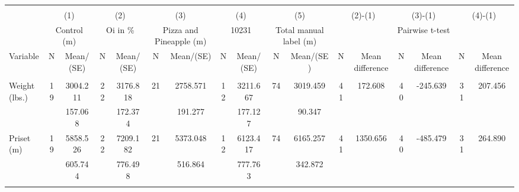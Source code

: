 
\begin{tabular}{@{\extracolsep{5pt}}lcccccccccccccccc}
\\[-1.8ex]\hline \hline \\[-1.8ex]
 & \multicolumn{2}{c}{(1)}  & \multicolumn{2}{c}{(2)}  & \multicolumn{2}{c}{(3)}  & \multicolumn{2}{c}{(4)}  & \multicolumn{2}{c}{(5)}  & \multicolumn{2}{c}{(2)-(1)} & \multicolumn{2}{c}{(3)-(1)} & \multicolumn{2}{c}{(4)-(1)} \\
 & \multicolumn{2}{c}{Control (m)}  & \multicolumn{2}{c}{Oi in \%}  & \multicolumn{2}{c}{Pizza and Pineapple (m)}  & \multicolumn{2}{c}{10231}  & \multicolumn{2}{c}{Total manual label (m)}  & \multicolumn{6}{c}{Pairwise t-test}  \\
Variable & N & Mean/(SE) & N & Mean/(SE) & N & Mean/(SE) & N & Mean/(SE) & N & Mean/(SE) & N & Mean difference & N & Mean difference & N & Mean difference \\ \hline \\[-1.8ex] 
Weight (lbs.)   & 19    &  3004.211    & 22    &  3176.818    & 21    &  2758.571    & 12    &  3211.667    & 74    &  3019.459    & 41    &   172.608    & 40    &  -245.639    & 31    &   207.456   \\
 &   &   157.068  &   &   172.374  &   &   191.277  &   &   177.127  &   &    90.347  &   &  &   &  &   &   \\
Priset (m)   & 19    &  5858.526    & 22    &  7209.182    & 21    &  5373.048    & 12    &  6123.417    & 74    &  6165.257    & 41    &  1350.656    & 40    &  -485.479    & 31    &   264.890   \\
 &   &   605.744  &   &   776.498  &   &   516.864  &   &   777.763  &   &   342.872  &   &  &   &  &   &   \\
\hline \\[-1.8ex]

\end{tabular}
